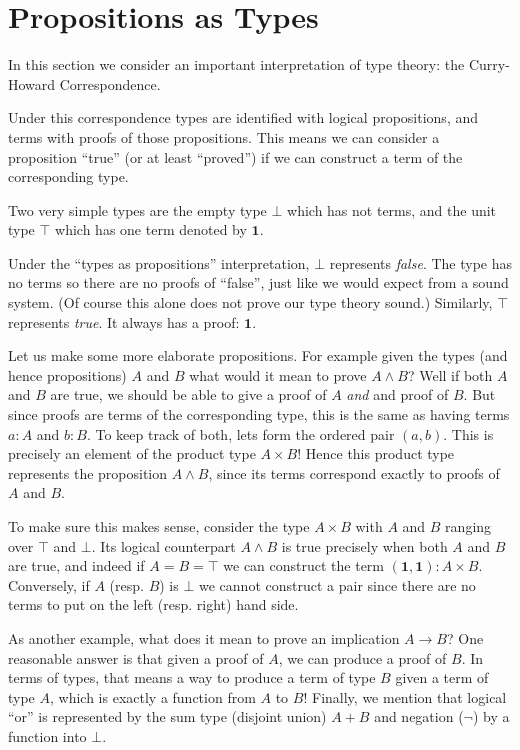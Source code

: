 \section{Propositions as Types}\label{sec:typesandprops}

In this section we consider an important interpretation of type theory: the
Curry-Howard Correspondence.

Under this correspondence types are identified with logical propositions, and
terms with proofs of those propositions. This means we can consider a
proposition ``true'' (or at least ``proved'') if we can construct a term of the
corresponding type.

Two very simple types are the empty type $\bot$ which has not terms, and the
unit type $\top$ which has one term denoted by $\mathbf{1}$.

Under the ``types as propositions'' interpretation, $\bot$ represents
\emph{false}. The type has no terms so there are no proofs of ``false'', just
like we would expect from a sound system. (Of course this alone does not prove
our type theory sound.) Similarly, $\top$ represents \emph{true}. It always has
a proof: $\mathbf{1}$.

Let us make some more elaborate propositions. For example given the types (and
hence propositions) $A$ and $B$ what would it mean to prove $A \land B$? Well if
both $A$ and $B$ are true, we should be able to give a proof of $A$ \emph{and}
and proof of $B$. But since proofs are terms of the corresponding type, this is
the same as having terms $a : A$ and $b : B$. To keep track of both, lets form
the ordered pair $(a, b)$. This is precisely an element of the product type $A
\times B$! Hence this product type represents the proposition $A \land B$, since
its terms correspond exactly to proofs of $A$ and $B$.

To make sure this makes sense, consider the type $A \times B$ with $A$ and $B$
ranging over $\top$ and $\bot$. Its logical counterpart $A \land B$ is true
precisely when both $A$ and $B$ are true, and indeed if $A = B = \top$ we can
construct the term $(\mathbf{1}, \mathbf{1}) : A \times B$. Conversely, if
$A$ (resp. $B$) is $\bot$ we cannot construct a pair since there are no terms to put on the
left (resp. right) hand side.

As another example, what does it mean to prove an implication $A \rightarrow B$?
One reasonable answer is that given a proof of $A$, we can produce a proof of
$B$. In terms of types, that means a way to produce a term of type $B$ given a
term of type $A$, which is exactly a function from $A$ to $B$! Finally, we
mention that logical ``or'' is represented by the sum type (disjoint union) $A +
B$ and negation ($\neg$) by a function into $\bot$.

